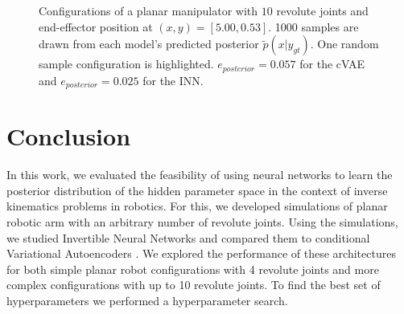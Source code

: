 \documentclass[conference]{IEEEtran}
\begin{document}
\begin{figure}[tbh]
\centering

    \caption{Configurations of a planar manipulator with $10$ revolute joints and end-effector position at $(x, y) = [5.00, 0.53]$. 1000 samples are drawn from each model's predicted posterior $\tilde{p}(x | y_{gt})$. One random sample configuration is highlighted. $e_{posterior} = 0.057$ for the cVAE and $e_{posterior} = 0.025$ for the INN.}
    \label{fig:posterior:10dof}
\end{figure}

\section*{Conclusion}

In this work, we evaluated the feasibility of using neural networks to learn the posterior distribution of the hidden parameter space in the context of inverse kinematics problems in robotics. For this, we developed simulations of planar robotic arm with an arbitrary number of revolute joints. Using the simulations, we studied Invertible Neural Networks \cite{Ardizzone2018} and compared them to conditional Variational Autoencoders \cite{Sohn2015}. We explored the performance of these architectures for both simple planar robot configurations with 4 revolute joints and more complex configurations with up to 10 revolute joints. To find the best set of hyperparameters we performed a hyperparameter search.
\end{document}
